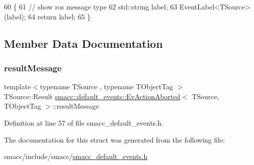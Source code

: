 \begin{DoxyCode}
60   \{
61     \textcolor{comment}{// show ros message type}
62     std::string label;
63     EventLabel<TSource>(label);
64     \textcolor{keywordflow}{return} label;
65   \}
\end{DoxyCode}


\subsection{Member Data Documentation}
\mbox{\label{structsmacc_1_1default__events_1_1EvActionAborted_a0cd103e20d922ab5039022b67fffd5f7}} 
\subsubsection{\texorpdfstring{result\+Message}{resultMessage}}
{\footnotesize\ttfamily template$<$typename T\+Source , typename T\+Object\+Tag $>$ \\
T\+Source\+::\+Result \hyperlink{structsmacc_1_1default__events_1_1EvActionAborted}{smacc\+::default\+\_\+events\+::\+Ev\+Action\+Aborted}$<$ T\+Source, T\+Object\+Tag $>$\+::result\+Message}



Definition at line 57 of file smacc\+\_\+default\+\_\+events.\+h.



The documentation for this struct was generated from the following file\+:\begin{DoxyCompactItemize}
\item 
smacc/include/smacc/\hyperlink{smacc__default__events_8h}{smacc\+\_\+default\+\_\+events.\+h}\end{DoxyCompactItemize}
